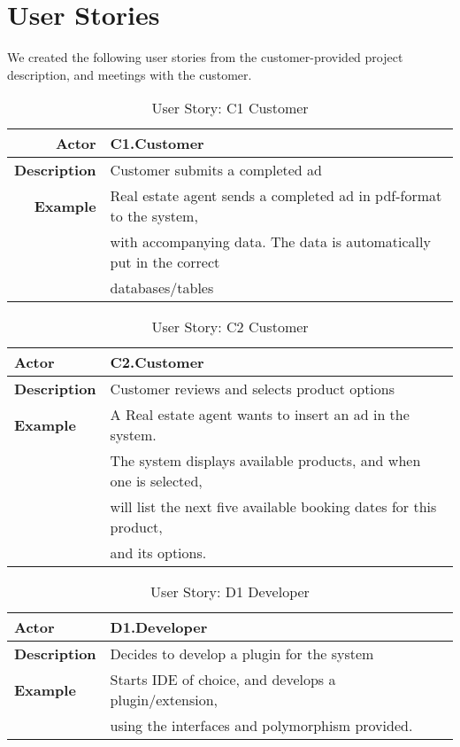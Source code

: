 \section{User Stories}

We created the following user stories from the customer-provided project
description, and meetings with the customer.

\begin{table}[H]
\begin{tabular}{| r | l |}
	\hline
	\textbf{Actor} & C1.Customer \\
	\hline
	\textbf{Description} & Customer submits a completed ad \\
	\hline
	\textbf{Example} & Real estate agent sends a completed ad in pdf-format to the system,\\
	& with accompanying data. The data is automatically put in the correct\\
	& databases/tables \\
	\hline
\end{tabular}
\caption{User Story: C1 Customer}
\end{table}

\begin{table}[H]
\begin{tabular}{| l | l |}
	\hline
	\textbf{Actor} & C2.Customer \\
	\hline
	\textbf{Description} & Customer reviews and selects product options \\
	\hline
	\textbf{Example} & A Real estate agent wants to insert an ad in the system.\\
	& The system displays available products, and when one is selected,\\
	& will list the next five available booking dates for this product,\\
	& and its options.\\
	\hline
\end{tabular}
\caption{User Story: C2 Customer}
\end{table}

\begin{table}[H]
\begin{tabular}{| l | l |}
	\hline
	\textbf{Actor} & D1.Developer \\
	\hline
	\textbf{Description} & Decides to develop a plugin for the system \\
	\hline
	\textbf{Example} & Starts IDE of choice, and develops a plugin/extension,\\
	& using the interfaces and polymorphism provided. \\
	\hline
\end{tabular}
\caption{User Story: D1 Developer}
\end{table}

